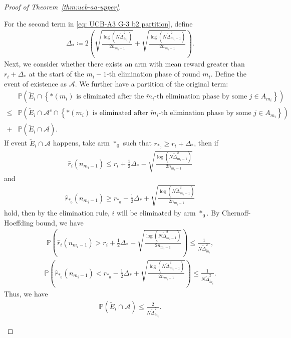 \documentclass[11pt]{article}
\begin{document}
\begin{proof}[Proof of Theorem~\ref{thm:ucb-aa-upper}]
\begin{itemize}
For the second term in \eqref{eq: UCB-A3 G-3 b2 partition}, define
\begin{align*}
    \Delta_*\coloneqq2\left(\sqrt{\frac{\log(N\tilde{\Delta}_{\tilde{m}_i}^2)}{2n_{m_i-1}}}+\sqrt{\frac{\log(N\tilde{\Delta}_{m_i-1}^2)}{2n_{m_i-1}}}\right).
\end{align*}
Next, we consider whether there exists an arm with mean reward greater than $r_i+\Delta_*$ at the start of the $m_i-1$-th elimination phase of round $m_i$. Define the event of existence as $\mathcal{A}$. We further have a partition of the original term:
\begin{align*}
    &\mathbb{P}\left(\tilde{E}_i\cap\left\{\text{$*(m_i)$ is eliminated after the $\tilde{m}_i$-th elimination phase } \text{by some }j\in A_{m_i}\right\}\right)\\
\leq &\mathbb{P}\left(\tilde{E}_i\cap\mathcal{A}^c\cap\left\{\text{$*(m_i)$ is eliminated after $\tilde{m}_i$-th elimination phase } \text{by some }j\in A_{m_i}\right\}\right)\\
+& \mathbb{P}\left(\tilde{E}_i\cap\mathcal{A}\right).
\end{align*}
If event $\tilde{E}_i\cap\mathcal{A}$ happens, take arm $*_0$ such that $r_{*_0}\geq r_i+\Delta_*$, then if
\begin{align*}
    \hat{r}_i(n_{m_i-1}) \leq r_i +\frac{1}{2}\Delta_* -\sqrt{\frac{\log(N \tilde{\Delta}_{m_i-1}^2)}{2n_{m_i-1}}} 
\end{align*}
and  
\begin{align*}
    \hat{r}_{*_0}(n_{m_i-1}) \geq r_{*_0} -\frac{1}{2}\Delta_*+\sqrt{\frac{\log(N \tilde{\Delta}_{m_i-1}^2)}{2n_{m_i-1}}} 
\end{align*}
hold, then by the elimination rule, $i$ will be eliminated by arm $*_0$. By Chernoff-Hoeffding bound, we have
\begin{align*}
\mathbb{P}\left(\hat{r}_i(n_{m_i-1}) > r_i +\frac{1}{2}\Delta_* -\sqrt{\frac{\log(N \tilde{\Delta}_{m_i-1}^2)}{2n_{m_i-1}}}\right)\leq \frac{1}{N\tilde{\Delta}_{\tilde{m}_i}^2},
\end{align*}
\begin{align*}
\mathbb{P}\left(\hat{r}_{*_0}(n_{m_i-1}) < r_{*_0} -\frac{1}{2}\Delta_*+\sqrt{\frac{\log(N \tilde{\Delta}_{m_i-1}^2)}{2n_{m_i-1}}} \right)\leq \frac{1}{N\tilde{\Delta}_{\tilde{m}_i}^2}.
\end{align*}
Thus, we have
\begin{align*}
    \mathbb{P}\left(\tilde{E}_i\cap\mathcal{A}\right)\leq \frac{2}{N\tilde{\Delta}_{\tilde{m}_i}^2}.
\end{align*}


\end{itemize}
\end{proof}
\end{document}
